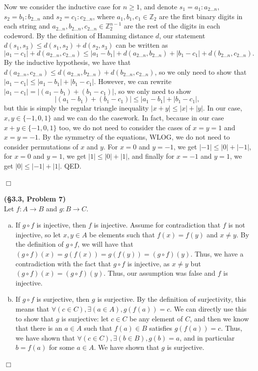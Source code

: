 \documentclass[12pt]{article}
\theoremstyle{definition}
\newenvironment{Solution}{\noindent {\sc Solution.}}{$\Box$ \vspace{2 ex}}
\begin{document}
\begin{Solution}
\begin{enumerate}[(a)]
    Now we consider the inductive case for $n \ge 1$, and denote $s_1 = a_1:a_{2\dots n}$, $s_2 = b_1:b_{2\dots n}$ and $s_2 = c_1:c_{2\dots n}$, where $a_1,b_1,c_1 \in \mathbb{Z}_2$ are the first binary digits in each string and $a_{2\dots n},b_{2\dots n},c_{2\dots n} \in \mathbb{Z}_2^{n-1}$ are the rest of the digits in each codeword. By the definition of Hamming distance $d$, our statement $d(s_1,s_3)\le d(s_1,s_2)+d(s_2,s_3)$ can be written as \[|a_1 - c_1| + d(a_{2\dots n}, c_{2\dots n}) \le |a_1 - b_1| + d(a_{2\dots n},b_{2 \dots n}) + |b_1 - c_1| +d(b_{2\dots n},c_{2\dots n}).\]
    By the inductive hypothesis, we have that $d(a_{2\dots n}, c_{2\dots n}) \le d(a_{2\dots n},b_{2 \dots n}) + d(b_{2\dots n},c_{2\dots n})$, so we only need to show that $|a_1 - c_1|  \le |a_1 - b_1| +|b_1 - c_1|$. However, we can rewrite $|a_1 - c_1 | = |(a_1 - b_1) + (b_1 - c_1)|$, so we only need to show
    \[|(a_1 - b_1) + (b_1 - c_1)| \le |a_1 - b_1| +|b_1 - c_1|,\]
    but this is simply the regular triangle inequality $|x + y| \le |x| + |y|$. In our case, $x,y\in \{-1, 0, 1\}$ and we can do the casework. In fact, because in our case $x + y \in \{-1,0,1\}$ too, we do not need to consider the cases of $x = y = 1$ and $x = y = -1$. By the symmetry of the equations, WLOG, we do not need to consider permutations of $x$ and $y$. For $x = 0$ and $y = -1$, we get $|-1| \le |0| + |-1|$, for $x = 0$ and $y = 1$, we get $|1| \le |0| + |1|$, and finally for $x = -1$ and $y = 1$, we get $|0| \le |-1| + |1|$. QED.
    
\end{enumerate}
\end{Solution}

\vspace{0.5cm}

\begin{Solution}
{\bf (\S3.3, Problem 7)}\\
Let $f : A \to B$ and $g : B \to C$. 
\begin{enumerate}[(a)]
    \item If $g \circ f$ is injective, then $f$ is injective. Assume for contradiction that $f$ is not injective, so let $x,y \in A$ be elements such that $f(x)=f(y)$ and $x \ne y$. By the definition of $g \circ f$, we will have that $(g\circ f)(x)= g(f(x)) = g(f(y)) = (g\circ f)(y)$. Thus, we have a contradiction with the fact that $g \circ f$ is injective, as $x \ne y$ but $(g\circ f)(x) = (g\circ f)(y)$. Thus, our assumption was false and $f$ is injective.
    \item If $g \circ f$ is surjective, then $g$ is surjective. By the definition of surjectivity, this means that $\forall (c \in C), \exists(a \in A), g(f(a))=c$. We can directly use this to show that $g$ is surjective: let $c \in C$ be any element of $C$, and then we know that there is an $a\in A$ such that $f(a) \in B$ satisfies $g(f(a))=c$. Thus, we have shown that $\forall (c \in C), \exists(b \in B), g(b)=a$, and in particular $b = f(a)$ for some $a \in A$. We have shown that $g$ is surjective.
\end{enumerate}
\end{Solution}
\end{document}
